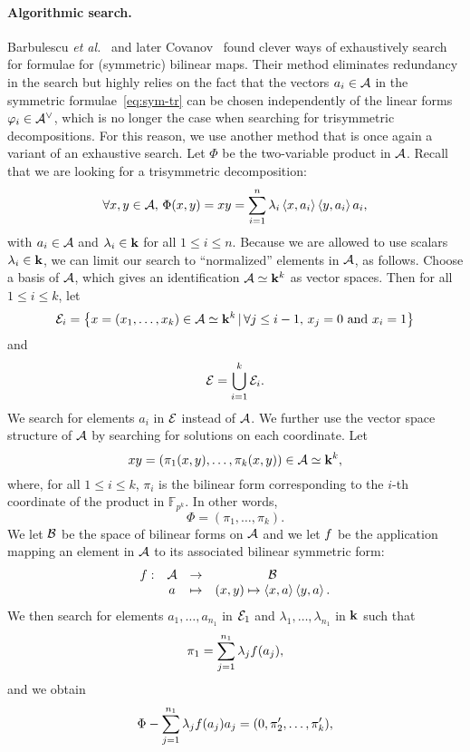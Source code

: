 \documentclass[11pt]{article}
\begin{document}
\paragraph{Algorithmic search.}
Barbulescu \emph{et al.}~\cite{BDEZ12} and later Covanov~\cite{Covanov19} found
clever ways of exhaustively search for formulae for (symmetric) bilinear maps.
Their method eliminates redundancy in the search but highly
relies on the fact that the vectors $a_i\in\mathcal{A}$ in 
the symmetric formulae~\eqref{eq:sym-tr} 
can be chosen independently of
the linear forms $\varphi_i\in\mathcal{A}^\vee$, which is no longer
the case when searching for trisymmetric decompositions. For this reason, we
use another method that is once again a variant of an exhaustive search. Let
$\Phi$ be the two-variable product in $\mathcal{A}$. Recall
that we are looking for a trisymmetric decomposition:
\[
  \forall x, y\in\mathcal{A},\,\Phi(x, y) = xy =
  \sum_{i=1}^{n}\lambda_i\left\langle x,a_i\right\rangle\left\langle y,a_i\right\rangle a_i,
\]
with $a_i\in\mathcal{A}$ and $\lambda_i\in\mathbf{k}$ for all $1\leq i
\leq n$. Because we are allowed to use scalars $\lambda_i\in\mathbf{k}$, we
can limit our search to ``normalized'' elements in $\mathcal{A}$, as follows. Choose
a basis of $\mathcal{A}$, which gives an identification $\mathcal{A}\simeq\mathbf{k}^k$ as vector spaces. Then for all
$1\leq i\leq k$, let
\[
  \mathcal{E}_i=\left\{ x=(x_1, \dots, x_k)\in\mathcal{A}\simeq\mathbf{k}^k
  \,|\, \forall j\leq i-1,\,x_j=0\text{ and }x_i=1 \right\}
\]
and
\[
  \mathcal{E} = \bigcup_{i=1}^k\mathcal{E}_i.
\]
We search for elements $a_i$ in $\mathcal{E}$ instead of $\mathcal{A}$. We further
use the vector space structure of $\mathcal{A}$ by searching for solutions
on each coordinate.
Let 
\[
  xy = (\pi_1(x, y), \dots, \pi_k(x, y))\in\mathcal{A}\simeq\mathbf{k}^k,
\]
where, for all $1\leq i\leq k$, $\pi_i$ is the bilinear form corresponding to
the $i$-th coordinate of the product in $\mathbb{F}_{p^k}$. In other words, 
\[
  \Phi = (\pi_1, \dots, \pi_k).
\]
We let $\mathcal{B}$ be the space of bilinear forms on $\mathcal{A}$ and we let $f$ be the
application mapping an element in $\mathcal{A}$ to its associated bilinear symmetric
form:
\[
\begin{array}{cccc}
  f: & \mathcal{A} & \to & \mathcal{B} \\
  & a & \mapsto & (x, y)\mapsto \left\langle x,a\right\rangle\left\langle y,a\right\rangle.
\end{array}
\]
We then search for elements $a_1, \dots, a_{n_1}$ in $\mathcal{E}_1$ and
$\lambda_1, \dots, \lambda_{n_1}$ in $\mathbf{k}$ such that 
\begin{equation}
  \pi_1 = \sum_{j=1}^{n_1}\lambda_jf(a_j),
  \label{eq:pi1}
\end{equation}
and we obtain
\[
  \Phi-\sum_{j=1}^{n_1}\lambda_jf(a_j)a_j = (0, \pi_2', \dots, \pi_k'), 
\]
\end{document}
